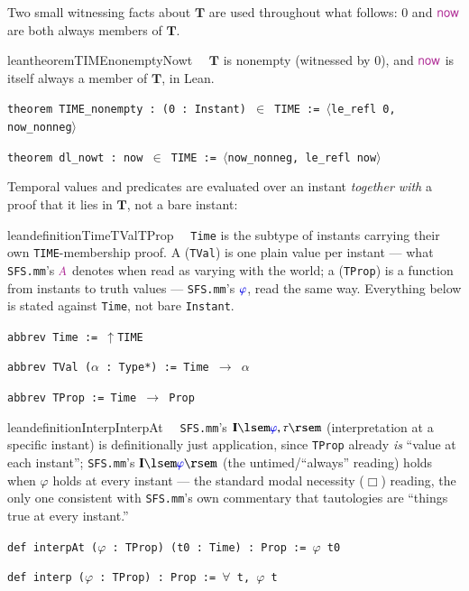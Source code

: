 \pn Two small witnessing facts about $\mathbf{T}$ are used throughout what follows: $0$ and $\mathsf{\mc{now}}$ are both always members of $\mathbf{T}$.

\begin{restatable}{leantheorem}{TIMEnonemptyNowt}~~ $\mathbf{T}$ is nonempty (witnessed by $0$), and $\mathsf{\mc{now}}$ is itself always a member of $\mathbf{T}$, in Lean.

\texttt{\textcolor{leancolor}{theorem} \textcolor{leanyellow}{TIME\_nonempty} : (0 : Instant) $\in$ TIME := $\langle$le\_refl 0, now\_nonneg$\rangle$}

\texttt{\textcolor{leancolor}{theorem} \textcolor{leanyellow}{dl\_nowt} : now $\in$ TIME := $\langle$now\_nonneg, le\_refl now$\rangle$}
\label{TIME_nonempty}
\label{dl_nowt}
\end{restatable}

\pn Temporal values and predicates are evaluated over an instant \emph{together with} a proof that it lies in $\mathbf{T}$, not a bare instant:

\begin{restatable}{leandefinition}{TimeTValTProp}~~ \texttt{Time} is the subtype of instants carrying their own \texttt{TIME}-membership proof. A  (\texttt{TVal}) is one plain value per instant --- what \texttt{SFS.mm}'s $\mc{A}$ denotes when read as varying with the world; a  (\texttt{TProp}) is a function from instants to truth values --- \texttt{SFS.mm}'s $\mw{\varphi}$, read the same way. Everything below is stated against \texttt{Time}, not bare \texttt{Instant}.

\texttt{\textcolor{leancolor}{abbrev} \textcolor{leanyellow}{Time} := $\uparrow$TIME}

\texttt{\textcolor{leancolor}{abbrev} \textcolor{leanyellow}{TVal} ($\alpha$ : Type*) := Time $\to$ $\alpha$}

\texttt{\textcolor{leancolor}{abbrev} \textcolor{leanyellow}{TProp} := Time $\to$ Prop}
\label{Time}
\label{TVal}
\label{TProp}
\end{restatable}

\begin{restatable}{leandefinition}{InterpInterpAt}~~ \texttt{SFS.mm}'s $\mathbf{I}\lsem\mw{\varphi},\tau\rsem$ (interpretation at a specific instant) is definitionally just application, since \texttt{TProp} already \emph{is} ``value at each instant''; \texttt{SFS.mm}'s $\mathbf{I}\lsem\mw{\varphi}\rsem$ (the untimed/``always'' reading) holds when $\varphi$ holds at every instant --- the standard modal necessity ($\Box$) reading, the only one consistent with \texttt{SFS.mm}'s own commentary that tautologies are ``things true at every instant.''

\texttt{\textcolor{leancolor}{def} \textcolor{leanyellow}{interpAt} ($\varphi$ : TProp) (t0 : Time) : Prop := $\varphi$ t0}

\texttt{\textcolor{leancolor}{def} \textcolor{leanyellow}{interp} ($\varphi$ : TProp) : Prop := $\forall$ t, $\varphi$ t}
\label{interpAt}
\label{interp}
\end{restatable}

